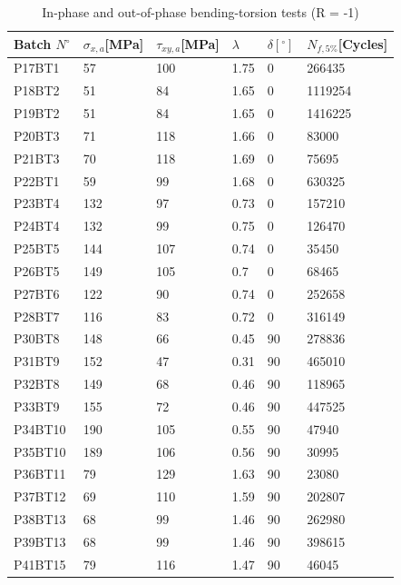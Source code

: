 \documentclass[3p,times,number,review]{elsarticle}
\begin{document}
\begin{table}[]
\centering
\begin{tabular}{|l|l|l|l|l|l|}
\hline
Batch $N^\circ$ & $\sigma_{x,a}${[}MPa{]} & $\tau_{xy,a}${[}MPa{]} & $\lambda$ & $\delta [^\circ]$ & $N_{f,5\%}${[}Cycles{]} \\ \hline
P17BT1 & 57 & 100 & 1.75 & 0 & 266435 \\ \hline
P18BT2 & 51 & 84 & 1.65 & 0 & 1119254 \\ \hline
P19BT2 & 51 & 84 & 1.65 & 0 & 1416225 \\ \hline
P20BT3 & 71 & 118 & 1.66 & 0 & 83000 \\ \hline
P21BT3 & 70 & 118 & 1.69 & 0 & 75695 \\ \hline
P22BT1 & 59 & 99 & 1.68 & 0 & 630325 \\ \hline
P23BT4 & 132 & 97 & 0.73 & 0 & 157210 \\ \hline
P24BT4 & 132 & 99 & 0.75 & 0 & 126470 \\ \hline
P25BT5 & 144 & 107 & 0.74 & 0 & 35450 \\ \hline
P26BT5 & 149 & 105 & 0.7 & 0 & 68465 \\ \hline
P27BT6 & 122 & 90 & 0.74 & 0 & 252658 \\ \hline
P28BT7 & 116 & 83 & 0.72 & 0 & 316149 \\ \hline
P30BT8 & 148 & 66 & 0.45 & 90 & 278836 \\ \hline
P31BT9 & 152 & 47 & 0.31 & 90 & 465010 \\ \hline
P32BT8 & 149 & 68 & 0.46 & 90 & 118965 \\ \hline
P33BT9 & 155 & 72 & 0.46 & 90 & 447525 \\ \hline
P34BT10 & 190 & 105 & 0.55 & 90 & 47940 \\ \hline
P35BT10 & 189 & 106 & 0.56 & 90 & 30995 \\ \hline
P36BT11 & 79 & 129 & 1.63 & 90 & 23080 \\ \hline
P37BT12 & 69 & 110 & 1.59 & 90 & 202807 \\ \hline
P38BT13 & 68 & 99 & 1.46 & 90 & 262980 \\ \hline
P39BT13 & 68 & 99 & 1.46 & 90 & 398615 \\ \hline
P41BT15 & 79 & 116 & 1.47 & 90 & 46045 \\ \hline
\end{tabular}
\caption{In-phase and out-of-phase bending-torsion tests (R = -1)\cite{susmel2003multiaxial}}
\label{tab.AL6082T6BT2D}
\end{table}
\end{document}
